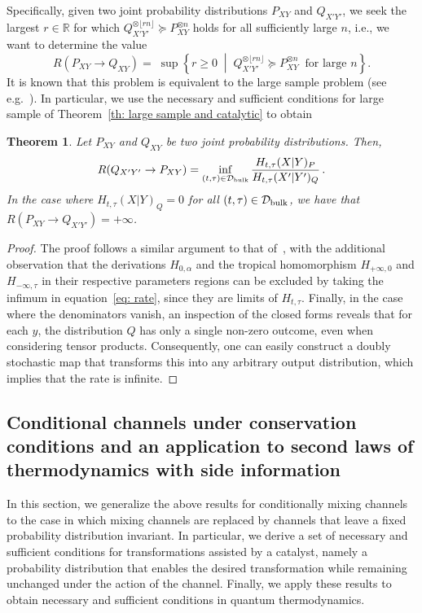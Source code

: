 \documentclass[aps,pra,11pt,onecolumn,nofootinbib,tightenlines]{revtex4-2}
\newtheorem{theorem}{Theorem}[section]
\theoremstyle{definition}
\newcommand{\D}{\mathcal{D}}
\begin{document}
Specifically, given two joint probability distributions $P_{XY}$ and $Q_{X'Y'}$, we seek the largest $r \in \mathbb{R}$ for which $  Q_{X'Y'}^{\otimes \lfloor r n \rfloor} \succeq  P_{XY}^{\otimes n}$ holds for all sufficiently large $n$, i.e., we want to determine the value
\begin{equation}
    R(P_{XY} \rightarrow Q_{XY}) =\; \sup\left\{ r \ge 0 \;\middle|\; Q_{X'Y'}^{\otimes \lfloor r n \rfloor} \succeq  P_{XY}^{\otimes n} \;\; \text{for large } n \right\}.
\end{equation}
It is known that this problem is equivalent to the large sample problem (see e.g.~\cite[Theorem 3.11]{Jensen_Kjaerulf_2019}). In particular, we use the necessary and sufficient conditions for large sample of Theorem~\ref{th: large sample and catalytic} to obtain
\begin{theorem}
\label{thm: rate}
    Let $P_{XY}$ and $Q_{XY}$ be two joint probability distributions. Then,
    \begin{equation}
    \label{eq: rate}
R(Q_{X'Y'}\rightarrow P_{XY}) = \inf_{(t,\tau) \in \D_{\rm{bulk}}} \frac{H_{t,\tau}(X|Y)_P}{H_{t,\tau}(X'|Y')_Q} \,.
\end{equation}
In the case where $H_{t,\tau}(X|Y)_Q=0$ for all $(t,\tau) \in \D_{\rm{bulk}}$, we have that $R(P_{XY}\rightarrow Q_{X'Y'})=+\infty$.
\end{theorem}
\begin{proof}
   The proof follows a similar argument to that of~\cite[Theorem 3.11]{Jensen_Kjaerulf_2019}, with the additional observation that the derivations $H_{0,\alpha}$ and the tropical homomorphism $H_{+\infty,0}$ and $H_{-\infty,\tau}$ in their respective parameters regions can be excluded by taking the infimum in equation~\eqref{eq: rate}, since they are limits of $H_{t,\tau}$. Finally, in the case where the denominators vanish, an inspection of the closed forms reveals that for each $y$, the distribution $Q$ has only a single non-zero outcome, even when considering tensor products. Consequently, one can easily construct a doubly stochastic map that transforms this into any arbitrary output distribution, which implies that the rate is infinite.
\end{proof}



\subsection{Conditional channels under conservation conditions and an application to second laws of thermodynamics with side information}
\label{sec: second laws of thermo}
In this section, we generalize the above results for conditionally mixing channels to the case in which mixing channels are replaced by channels that leave a fixed probability distribution invariant. In particular, we derive a set of necessary and sufficient conditions for transformations assisted by a catalyst, namely a probability distribution that enables the desired transformation while remaining unchanged under the action of the channel.
Finally, we apply these results to obtain necessary and sufficient conditions in quantum thermodynamics.
\end{document}
